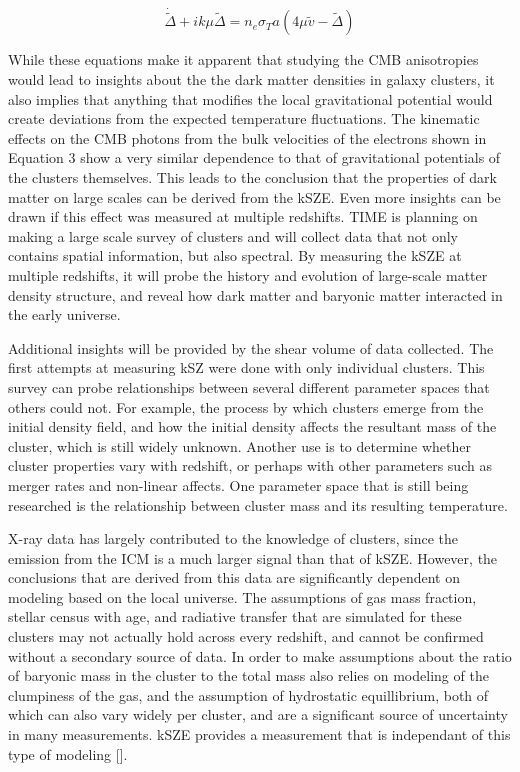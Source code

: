 \documentclass[manuscript]{aastex}
\begin{document}
\begin{equation}
\dot{\tilde \Delta} + ik\mu \tilde\Delta = n_{e} \sigma_{T} a (4 \mu \tilde v - \tilde \Delta)
\end{equation}

While these equations make it apparent that studying the CMB anisotropies would lead to insights about the the dark matter densities in galaxy clusters, it also implies that anything that modifies the local gravitational potential would create deviations from the expected temperature fluctuations. The kinematic effects on the CMB photons from the bulk velocities of the electrons shown in Equation 3 show a very similar dependence to that of gravitational potentials of the clusters themselves. This leads to the conclusion that the properties of dark matter on large scales can be derived from the kSZE. Even more insights can be drawn if this effect was measured at multiple redshifts. TIME is planning on making a large scale survey of clusters and will collect data that not only contains spatial information, but also spectral. By measuring the kSZE at multiple redshifts, it will probe the history and evolution of large-scale matter density structure, and reveal how dark matter and baryonic matter interacted in the early universe.

Additional insights will be provided by the shear volume of data collected. The first attempts at measuring kSZ were done with only individual clusters. This survey can probe relationships between several different parameter spaces that others could not. For example, the process by which clusters emerge from the initial density field, and how the initial density affects the resultant mass of the cluster, which is still widely unknown. Another use is to determine whether cluster properties vary with redshift, or perhaps with other parameters such as merger rates and non-linear affects. One parameter space that is still being researched is the relationship between cluster mass and its resulting temperature. 

X-ray data has largely contributed to the knowledge of clusters, since the emission from the ICM is a much larger signal than that of kSZE. However, the conclusions that are derived from this data are significantly dependent on modeling based on the local universe. The assumptions of gas mass fraction, stellar census with age, and radiative transfer that are simulated for these clusters may not actually hold across every redshift, and cannot be confirmed without a secondary source of data. In order to make assumptions about the ratio of baryonic mass in the cluster to the total mass also relies on modeling of the clumpiness of the gas, and the assumption of hydrostatic equillibrium, both of which can also vary widely per cluster, and are a significant source of uncertainty in many measurements. kSZE provides a measurement that is independant of this type of modeling [\cite{Carlstrom2002}].
\end{document}
